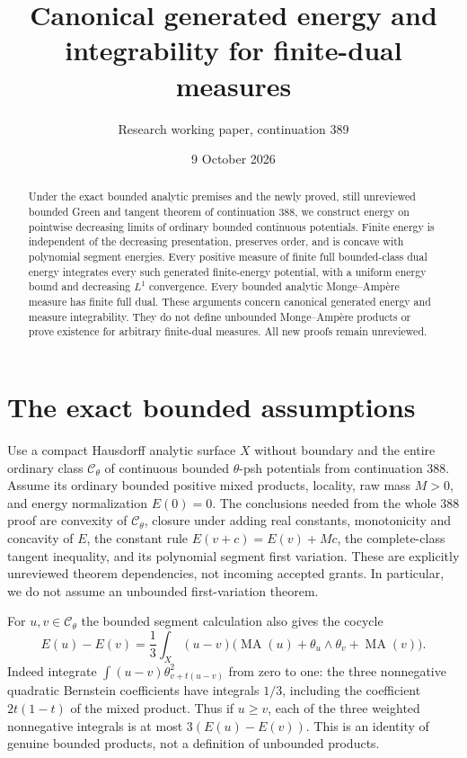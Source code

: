 \documentclass[11pt]{article}
\title{Canonical generated energy and integrability for finite-dual measures}
\author{Research working paper, continuation 389}
\date{9 October 2026}
\newcommand{\MA}{\operatorname{MA}}
\begin{document}
\maketitle
\begin{abstract}
Under the exact bounded analytic premises and the newly proved, still
unreviewed bounded Green and tangent theorem of continuation 388, we
construct energy on pointwise decreasing limits of ordinary bounded
continuous potentials. Finite energy is independent of the decreasing
presentation, preserves order, and is concave with polynomial segment
energies. Every positive measure of finite full bounded-class dual energy
integrates every such generated finite-energy potential, with a uniform
energy bound and decreasing $L^1$ convergence. Every bounded analytic
Monge--Amp\`ere measure has finite full dual. These arguments concern
canonical generated energy and measure integrability. They do not define
unbounded Monge--Amp\`ere products or prove existence for arbitrary
finite-dual measures. All new proofs remain unreviewed.
\end{abstract}

\section{The exact bounded assumptions}
Use a compact Hausdorff analytic surface $X$ without boundary and the
entire ordinary class $\mathcal C_\theta$ of continuous bounded
$\theta$-psh potentials from continuation 388. Assume its ordinary
bounded positive mixed products, locality, raw mass $M>0$, and energy
normalization $E(0)=0$. The conclusions needed from the whole 388 proof
are convexity of $\mathcal C_\theta$, closure under adding real constants,
monotonicity and concavity of $E$, the constant rule $E(v+c)=E(v)+Mc$,
the complete-class tangent inequality, and its polynomial segment
first variation. These are explicitly unreviewed theorem dependencies,
not incoming accepted grants. In particular, we do not assume an
unbounded first-variation theorem.

For $u,v\in\mathcal C_\theta$ the bounded segment calculation also
gives the cocycle
\begin{equation}\label{eq:cocycle}
 E(u)-E(v)=\frac13\int_X(u-v)
       \bigl(\MA(u)+\theta_u\wedge\theta_v+\MA(v)\bigr).
\end{equation}
Indeed integrate $\int (u-v)\theta_{v+t(u-v)}^2$ from zero to one:
the three nonnegative quadratic Bernstein coefficients have integrals
$1/3$, including the coefficient $2t(1-t)$ of the mixed product.
Thus if $u\geq v$, each of the three weighted nonnegative integrals
is at most $3(E(u)-E(v))$. This is an identity of genuine bounded
products, not a definition of unbounded products.
\end{document}
